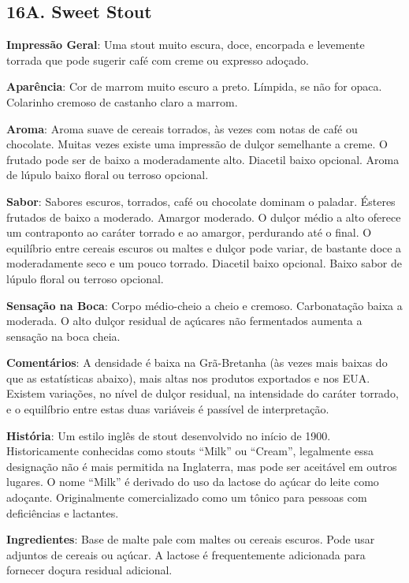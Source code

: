 \subsection*{16A. Sweet Stout}
\textbf{Impressão Geral}: Uma stout muito escura, doce, encorpada e levemente torrada que pode sugerir café com creme ou expresso adoçado.

\textbf{Aparência}: Cor de marrom muito escuro a preto. Límpida, se não for opaca. Colarinho cremoso de castanho claro a marrom.

\textbf{Aroma}: Aroma suave de cereais torrados, às vezes com notas de café ou chocolate. Muitas vezes existe uma impressão de dulçor semelhante a creme. O frutado pode ser de baixo a moderadamente alto. Diacetil baixo opcional. Aroma de lúpulo baixo floral ou terroso opcional.

\textbf{Sabor}: Sabores escuros, torrados, café ou chocolate dominam o paladar. Ésteres frutados de baixo a moderado. Amargor moderado. O dulçor médio a alto oferece um contraponto ao caráter torrado e ao amargor, perdurando até o final. O equilíbrio entre cereais escuros ou maltes e dulçor pode variar, de bastante doce a moderadamente seco e um pouco torrado. Diacetil baixo opcional. Baixo sabor de lúpulo floral ou terroso opcional.

\textbf{Sensação na Boca}: Corpo médio-cheio a cheio e cremoso. Carbonatação baixa a moderada. O alto dulçor residual de açúcares não fermentados aumenta a sensação na boca cheia.

\textbf{Comentários}: A densidade é baixa na Grã-Bretanha (às vezes mais baixas do que as estatísticas abaixo), mais altas nos produtos exportados e nos EUA. Existem variações, no nível de dulçor residual, na intensidade do caráter torrado, e o equilíbrio entre estas duas variáveis é passível de interpretação.

\textbf{História}: Um estilo inglês de stout desenvolvido no início de 1900. Historicamente conhecidas como stouts “Milk” ou “Cream”, legalmente essa designação não é mais permitida na Inglaterra, mas pode ser aceitável em outros lugares. O nome “Milk” é derivado do uso da lactose do açúcar do leite como adoçante. Originalmente comercializado como um tônico para pessoas com deficiências e lactantes.

\textbf{Ingredientes}: Base de malte pale com maltes ou cereais escuros. Pode usar adjuntos de cereais ou açúcar. A lactose é frequentemente adicionada para fornecer doçura residual adicional.

